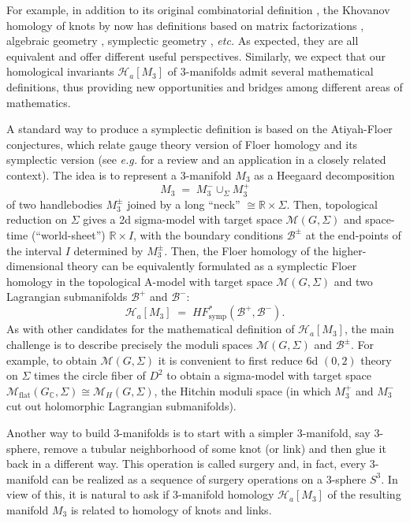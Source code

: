 \documentclass[hyper,letterpaper]{JHEP3}
\newcommand{\be}{\begin{equation}}
\newcommand{\ee}{\end{equation}}
\newcommand{\R}{{\mathbb R}}
\newcommand{\C}{{\mathbb C}}
\def\CB{{\mathcal B}}
\def\CH{{\mathcal H}}
\def\CM{{\mathcal M}}
\begin{document}
For example, in addition to its original combinatorial definition \cite{khovanov1999categorification},
the Khovanov homology of knots by now has definitions based on matrix factorizations \cite{khovanov2008matrix},
algebraic geometry \cite{MR2411561}, symplectic geometry \cite{MR2254624,MR2313538,AbouzaidSmith}, {\it etc.}
As expected, they are all equivalent \cite{Cautis,MackaayWebster} and offer different useful perspectives.
Similarly, we expect that our homological invariants $\CH_a[M_3]$ of 3-manifolds admit several mathematical definitions,
thus providing new opportunities and bridges among different areas of mathematics.

A standard way to produce a symplectic definition is based on the Atiyah-Floer conjectures, which relate gauge theory version of
Floer homology and its symplectic version (see {\it e.g.} \cite{Gukov:2007ck} for a review and an application in a closely related context).
The idea is to represent a 3-manifold $M_3$ as a Heegaard decomposition
\be
M_3 \; = \; M_3^{-} \cup_{\Sigma} M_3^+
\ee
of two handlebodies $M_3^{\pm}$ joined by a long ``neck'' $\cong \R \times \Sigma$. Then, topological reduction on $\Sigma$
gives a 2d sigma-model with target space $\CM (G, \Sigma)$ and space-time (``world-sheet'') $\R \times I$,
with the boundary conditions $\CB^{\pm}$ at the end-points of the interval $I$ determined by $M_3^{\pm}$.
Then, the Floer homology of the higher-dimensional theory can be equivalently formulated as a symplectic Floer homology
in the topological A-model with target space $\CM (G, \Sigma)$ and two Lagrangian submanifolds $\CB^+$ and $\CB^-$:
\be
\CH_a[M_3] \; = \; HF^*_{\text{symp}} (\CB^+, \CB^-).
\ee
As with other candidates for the mathematical definition of $\CH_a[M_3]$, the main challenge is to
describe precisely the moduli spaces  $\CM (G, \Sigma)$ and $\CB^{\pm}$.
For example, to obtain $\CM (G, \Sigma)$ it is convenient to first reduce 6d $(0,2)$ theory on $\Sigma$ times
the circle fiber of $D^2$ to obtain a sigma-model with target space $\CM_{\text{flat}} (G_{\C}, \Sigma) \cong \CM_H (G,\Sigma)$,
the Hitchin moduli space (in which $M_3^+$ and $M_3^-$ cut out holomorphic Lagrangian submanifolds).

Another way to build 3-manifolds is to start with a simpler 3-manifold, say 3-sphere, remove a tubular neighborhood of
some knot (or link) and then glue it back in a different way. This operation is called surgery and, in fact, every 3-manifold
can be realized as a sequence of surgery operations on a 3-sphere $S^3$. In view of this, it is natural to ask if
3-manifold homology $\CH_a[M_3]$ of the resulting manifold $M_3$ is related to homology of knots and links.
\end{document}
